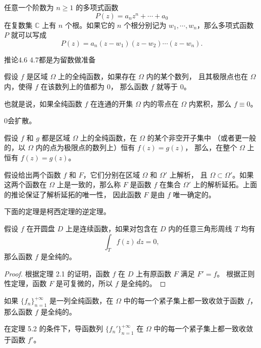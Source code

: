 \documentclass[lang=cn,10pt]{elegantbook}
\begin{document}
\begin{corollary}[推论 4.7因式分解定理]
任意一个阶数为 $n \geq 1$ 的多项式函数
\[
P(z) = a_n z^n + \cdots + a_0
\]
在复数集 $\mathbb{C}$ 上有 $n$ 个根。如果它的 $n$ 个根分别记为 $w_1, \cdots, w_n$，那么多项式函数 $P$ 就可以写成
\[
P(z) = a_n (z-w_1)(z-w_2)\cdots(z-w_n).
\]
\end{corollary}
\begin{dxtips}
    推论4.6 4.7都是为留数做准备
\end{dxtips}
\begin{theorem}[定理 4.8 恒等定理]
假设 $f$ 是区域 $\Omega$ 上的全纯函数，如果存在 $\Omega$ 内的某个数列，
且其极限点也在 $\Omega$ 内，使得 $f$ 在该数列上的值都为 $0$，
那么函数 $f$ 就等于 $0$。

也就是说，如果全纯函数 $f$ 在连通的开集 $\Omega$ 内的零点在 $\Omega$ 内累积，那么 $f \equiv 0$。
\end{theorem}
0会扩散。
\begin{corollary}[推论 4.9]
假设 $f$ 和 $g$ 都是区域 $\Omega$ 上的全纯函数，在 $\Omega$ 的某个非空开子集中
（或者更一般的，以 $\Omega$ 内的点为极限点的数列上）恒有 $f(z)=g(z)$，
那么，在整个 $\Omega$ 上恒有 $f(z)=g(z)$。

假设给出两个函数 $f$ 和 $F$，它们分别在区域 $\Omega$ 和 $\Omega'$ 上解析，
且 $\Omega \subset \Omega'$。如果这两个函数在 $\Omega$ 上是一致的，那么称
$F$ 是函数 $f$ 在集合 $\Omega'$ 上的解析延拓。上面的推论保证了解析延拓的唯一性，
因此函数 $F$ 是由 $f$ 唯一确定的。
\end{corollary}


下面的定理是柯西定理的逆定理。

\begin{theorem}
假设 $f$ 在开圆盘 $D$ 上是连续函数，如果对包含在 $D$ 内的任意三角形周线 $T$ 均有
\[
\int_{T} f(z)\,dz = 0,
\]
那么函数 $f$ 是全纯的。
\end{theorem}

\begin{proof}
根据定理 2.1 的证明，函数 $f$ 在 $D$ 上有原函数 $F$ 满足 $F' = f$。  
根据正则性定理，函数 $F$ 是可复微的，所以 $f$ 是全纯的。
\end{proof}
\begin{theorem}[5.2全纯性质可以通过一致收敛传递]
如果 $\{ f_n \}_{n=1}^{+\infty}$ 是一列全纯函数，在 $\Omega$ 中的每一个紧子集上都一致收敛于函数 $f$，那么函数 $f$ 是全纯的。
\end{theorem}
\begin{theorem}[5.3]
在定理 5.2 的条件下，导函数列 $\{ f_n' \}_{n=1}^{+\infty}$ 在 $\Omega$ 中的每一个紧子集上都一致收敛于函数 $f'$。
\end{theorem}
\end{document}
